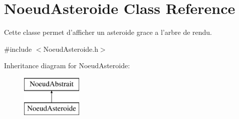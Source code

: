 \hypertarget{class_noeud_asteroide}{\section{Noeud\-Asteroide Class Reference}
\label{class_noeud_asteroide}
}


Cette classe permet d'afficher un asteroide grace a l'arbre de rendu.  




{\ttfamily \#include $<$Noeud\-Asteroide.\-h$>$}

Inheritance diagram for Noeud\-Asteroide\-:\begin{figure}[H]
\begin{center}
\leavevmode
\includegraphics[height=2.000000cm]{class_noeud_asteroide}
\end{center}
\end{figure}
